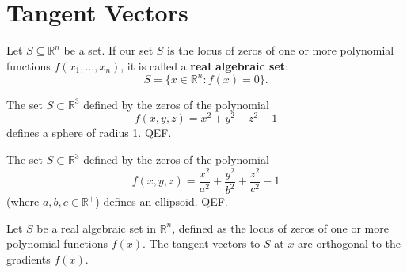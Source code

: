 \section{Tangent Vectors}
\begin{defn}
Let $S\subseteq\mathbb{R}^n$ be a set. If our set $S$ is the locus of zeros of one or more polynomial functions $f(x_1,\ldots,x_n)$, it is called a \textbf{real algebraic set}:
\begin{equation}
S = \{ x\in\mathbb{R}^n: f(x) = 0\}.
\end{equation}
\end{defn}

\begin{ex}
The set $S\subset\mathbb{R}^3$ defined by the zeros of the polynomial
\begin{equation}
f(x,y,z) = x^2 + y^2 + z^2 - 1
\end{equation}
defines a sphere of radius 1. QEF.
\end{ex}

\begin{ex}
The set $S\subset\mathbb{R}^3$ defined by the zeros of the polynomial
\begin{equation}
f(x,y,z) = \frac{x^2}{a^2} + \frac{y^2}{b^2} + \frac{z^2}{c^2} - 1
\end{equation}
(where $a,b,c\in\mathbb{R}^{+}$) defines an ellipsoid. QEF.
\end{ex}

\begin{lem}\label{lemma1}
Let $S$ be a real algebraic set in $\mathbb{R}^n$, defined as the locus of zeros of one or more polynomial functions $f(x)$. The tangent vectors to $S$ at $x$ are orthogonal to the gradients $f(x)$.
\end{lem}
